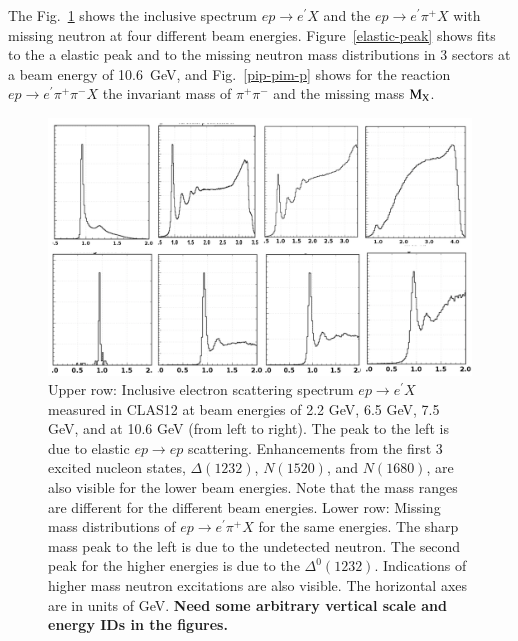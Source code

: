\documentclass[final,3p,times,twocolumn,authoryear]{elsarticle}
\begin{document}
The Fig.~\ref{spectrum} shows the inclusive spectrum $ep \to e^\prime X$ and the $ep \to e^\prime \pi^+ X$ with missing neutron 
at four different beam energies. Figure~\ref{elastic-peak} shows fits to the a elastic peak and to the missing neutron mass distributions
in 3 sectors at a beam energy of 10.6~GeV, and Fig.~\ref{pip-pim-p} shows for the reaction $ep \to e^\prime \pi^+ \pi^- X$ the invariant 
mass of $\pi^+\pi^-$ and the missing mass $\rm M_X$.  
\begin{figure}[ht]
\centerline{\includegraphics[width=1.0\columnwidth]{W-spectrum.png}}
\caption{Upper row: Inclusive electron scattering spectrum $ep \to e^\prime X$ measured in CLAS12 at beam energies 
of 2.2 GeV, 6.5 GeV, 7.5 GeV, and at 10.6 GeV (from left to right). 
The peak to the left is due to elastic $ep \to ep$ scattering. Enhancements from the first 3 excited nucleon states, $\Delta(1232)$, $N(1520)$, and $N(1680)$, are also visible for the lower beam energies. Note that the mass ranges  are different for the different beam energies. 
Lower row:  Missing mass distributions of $ep\to e^\prime \pi^+X$ for the same energies. The sharp mass peak to the left is due to 
 the undetected neutron. The second peak for the higher energies is due to the $\Delta^0(1232)$. Indications of higher mass neutron 
 excitations are also visible. The horizontal axes are in units of GeV. {\bf Need some arbitrary vertical scale and energy  IDs in the figures.} } 
\label{spectrum}
\end{figure} 
\end{document}
